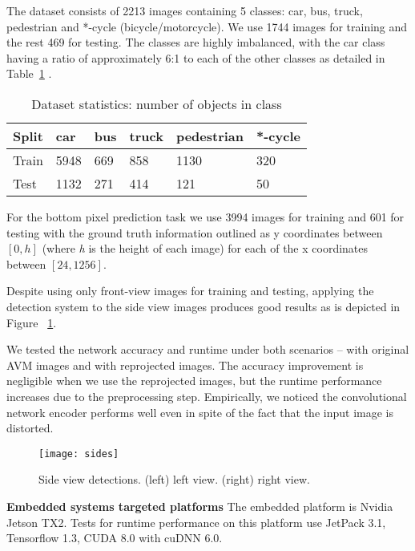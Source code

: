 \documentclass[10pt,twocolumn,letterpaper]{article}
\begin{document}
The dataset consists of 2213 images containing 5 classes: car, bus, truck, pedestrian and *-cycle (bicycle/motorcycle). We use 1744 images for training and the rest 469 for testing. The classes are highly imbalanced, with the car class having a ratio of approximately 6:1 to each of the other classes as detailed in Table~\ref{db_stats} .
\begin{table}
\begin{center}
\begin{tabular}{l|l|l|l|l|l}
\textbf{Split} & \textbf{car} & \textbf{bus}  & \textbf{truck} & \textbf{pedestrian} & \textbf{*-cycle}\\\hline
Train & 5948  &669 &858 &1130 &320  \\
Test &1132 &271 &414 &121 &50        
\end{tabular}
\end{center}
\caption{Dataset statistics: number of objects in class}
\label{db_stats}
\end{table}

For the bottom pixel prediction task we use 3994 images for training and 601 for testing with the ground truth information outlined as y coordinates between $[0, h]$ (where \textit{h} is the height of each image) for each of the x coordinates between $[24, 1256]$.

Despite using only front-view images for training and testing, applying the detection system to the side view images produces good results as is depicted in Figure ~\ref{fig:sides}.

We tested the network accuracy and runtime under both scenarios – with original AVM images and with reprojected images. The accuracy improvement is negligible when we use the reprojected images, but the runtime performance increases due to the preprocessing step. Empirically, we noticed the convolutional network encoder performs well even in spite of the fact that the input image is distorted. 

\begin{figure}[t]
\begin{center}
\texttt{[image: sides]}
\end{center}
   \caption{Side view detections. (left) left view. (right) right view.}
\label{fig:sides}
\end{figure}

\textbf{Embedded systems targeted platforms }
The embedded platform is Nvidia Jetson TX2. Tests for runtime performance on this platform use JetPack 3.1, Tensorflow 1.3, CUDA 8.0 with cuDNN 6.0.
\end{document}
